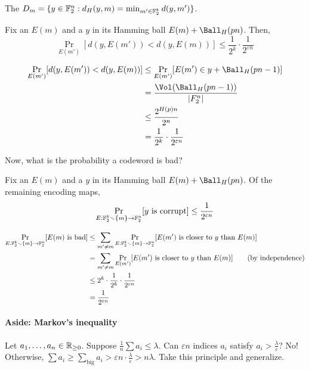 \documentclass[class=co432,notes,tikz]{agony}
\begin{document}
\begin{defn}
  The  $D_m = \{y \in \mathbb{F}_2^n : d_H(y,m) = \min_{m'\in \mathbb{F}_2^k} d(y,m')\}$.
\end{defn}

\begin{claim}
  Fix an $E(m)$ and a $y$ in its Hamming ball $E(m) + \Ball_H(pn)$. Then,
  \[
    \Pr_{E(m')}[d(y,E(m')) < d(y,E(m))] \leq \frac{1}{2^k}\cdot\frac{1}{2^{\varepsilon n}}
  \]
\end{claim}
\begin{prf}
  \begin{align*}
    \Pr_{E(m')}[d(y,E(m')) < d(y,E(m))]
     & \leq \Pr_{E(m')}[E(m') \in y+\Ball_H(pn-1)]     \\
     & = \frac{\Vol(\Ball_H(pn-1))}{\abs{F_2^n}}       \\
     & \leq \frac{2^{H(p)n}}{2^n}                      \\
     & = \frac{1}{2^k}\cdot\frac{1}{2^{\varepsilon n}}
  \end{align*}
\end{prf}

Now, what is the probability a codeword is bad?

\begin{claim}
  Fix an $E(m)$ and a $y$ in its Hamming ball $E(m) + \Ball_H(pn)$.
  Of the remaining encoding maps,
  \[
    \Pr_{E : \mathbb{F}_2^k \smallsetminus \{m\} \to \mathbb{F}_2^n} [\text{$y$ is corrupt}]
    \leq \frac{1}{2^{\varepsilon n}}
  \]
\end{claim}
\begin{prf}
  \begin{align*}
    \Pr_{E : \mathbb{F}_2^k \smallsetminus \{m\} \to \mathbb{F}_2^n} [\text{$E(m)$ is bad}]
     & \leq \sum_{m' \neq m} \Pr_{E : \mathbb{F}_2^k \smallsetminus \{m\} \to \mathbb{F}_2^n}[\text{$E(m')$ is closer to $y$ than $E(m)$}] \\
     & = \sum_{m' \neq m} \Pr_{E(m')}[\text{$E(m')$ is closer to $y$ than $E(m)$}] \tag{by independence}              \\
     & \leq 2^k \cdot \frac{1}{2^k} \cdot \frac{1}{2^{\varepsilon n}}                                                 \\
     & = \frac{1}{2^{\varepsilon n}}
  \end{align*}
\end{prf}

\paragraph{Aside: Markov's inequality} Let $a_1,\dotsc,a_n \in \mathbb{R}_{\geq 0}$.
Suppose $\frac1n\sum a_i \leq \lambda$.
Can $\varepsilon n$ indices $a_i$ satisfy $a_i > \frac\lambda\varepsilon$?
No! Otherwise, $\sum a_i \geq \sum_{\text{big}} a_i > \varepsilon n \cdot \frac{\lambda}{\varepsilon} > n \lambda$.
Take this principle and generalize.
\end{document}
